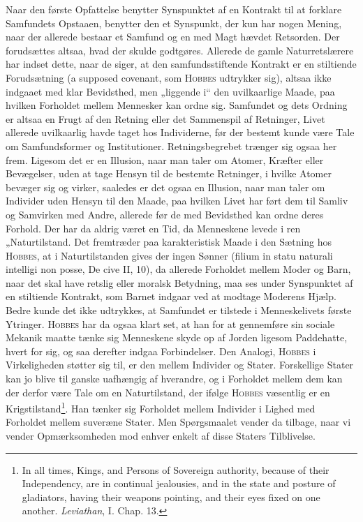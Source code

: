 \documentclass[12pt]{article}
\begin{document}
Naar den første Opfattelse benytter Synspunktet af en Kontrakt til at forklare
Samfundets Opstaaen, benytter den et Synspunkt, der kun har nogen Mening, naar
der allerede bestaar et Samfund og en med Magt hævdet Retsorden. Der
forudsættes altsaa, hvad der skulde godtgøres. Allerede de gamle Naturretslærere
har indset dette, naar de siger, at den samfundsstiftende Kontrakt er en
stiltiende Forudsætning (a supposed covenant, som \textsc{Hobbes} udtrykker sig),
altsaa ikke indgaaet med klar Bevidsthed, men „liggende i“ den uvilkaarlige Maade,
paa hvilken Forholdet mellem Mennesker kan ordne sig. Samfundet og dets Ordning
er altsaa en Frugt af den Retning eller det Sammenspil af Retninger, Livet
allerede uvilkaarlig havde taget hos Individerne, før der bestemt kunde være Tale
om Samfundsformer og Institutioner. Retningsbegrebet trænger sig ogsaa her frem.
Ligesom det er en Illusion, naar man taler om Atomer, Kræfter eller Bevægelser,
uden at tage Hensyn til de bestemte Retninger, i hvilke Atomer bevæger sig og
virker, saaledes er det ogsaa en Illusion, naar man taler om Individer uden
Hensyn til den Maade, paa hvilken Livet har ført dem til Samliv og Samvirken med
Andre, allerede før de med Bevidsthed kan ordne deres Forhold. Der har da aldrig
været en Tid, da Menneskene levede i ren „Naturtilstand\guillemotleft. Det fremtræder paa
karakteristisk Maade i den Sætning hos \textsc{Hobbes}, at i Naturtilstanden gives
der ingen Sønner (filium in statu naturali intelligi non posse, De cive II, 10),
da allerede Forholdet mellem Moder og Barn, naar det skal have retslig eller
moralsk Betydning, maa ses under Synspunktet af en stiltiende Kontrakt, som
Barnet indgaar ved at modtage Moderens Hjælp. Bedre kunde det ikke udtrykkes, at
Samfundet er tilstede i Menneskelivets første Ytringer. \textsc{Hobbes} har da
ogsaa klart set, at han for at gennemføre sin sociale Mekanik maatte tænke sig
Menneskene skyde op af Jorden ligesom Paddehatte, hvert for sig, og saa derefter
indgaa Forbindelser. Den Analogi, \textsc{Hobbes} i Virkeligheden støtter sig
til, er den mellem Individer og Stater. Forskellige Stater kan jo blive til
ganske uafhængig af hverandre, og i Forholdet mellem dem kan der derfor være Tale
om en Naturtilstand, der ifølge \textsc{Hobbes} væsentlig er en
Krigstilstand\footnote{In all times, Kings, and Persons of Sovereign authority,
because of their Independency, are in continual jealousies, and in the state and
posture of gladiators, having their weapons pointing, and their eyes fixed on one
another. \textit{Leviathan}, I. Chap. 13.}. Han tænker sig Forholdet mellem
Individer i Lighed med Forholdet mellem suveræne Stater. Men Spørgsmaalet vender
da tilbage, naar vi vender Opmærksomheden mod enhver enkelt af disse Staters
Tilblivelse.
\end{document}
